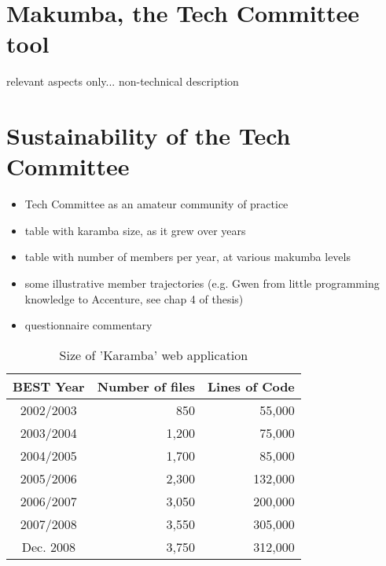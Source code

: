 \documentclass{acm_proc_article-sp}
\begin{document}
\section{Makumba, the Tech Committee tool}\label{sec:makumba}
relevant aspects only... non-technical description

\section{Sustainability of the Tech Committee}
\begin{itemize}
\item Tech Committee as an amateur community of practice
\item table with karamba size, as it grew over years
\item table with number of members per year, at various makumba levels
\item some illustrative member trajectories (e.g. Gwen from little programming knowledge to Accenture, see chap 4 of thesis)
\item questionnaire commentary
\end{itemize}

\begin{table}\label{tab:karamba}
	\centering
	\caption{Size of 'Karamba' web application}
	\begin{tabular}{c|r|r}
		\hline
		\hline
		BEST Year 		& Number of files 	& Lines of Code\\
		\hline
		\hline
		2002/2003		& 850				& 55,000 \\
		\hline
		2003/2004		& 1,200				& 75,000 \\
		\hline
		2004/2005		& 1,700				& 85,000 \\
		\hline
		2005/2006		& 2,300				& 132,000 \\
		\hline
		2006/2007		& 3,050				& 200,000 \\
		\hline
		2007/2008		& 3,550				& 305,000 \\
		\hline
		Dec. 2008		& 3,750				& 312,000 \\
		\hline
		\hline
	\end{tabular}
\end{table} 

\end{document}

